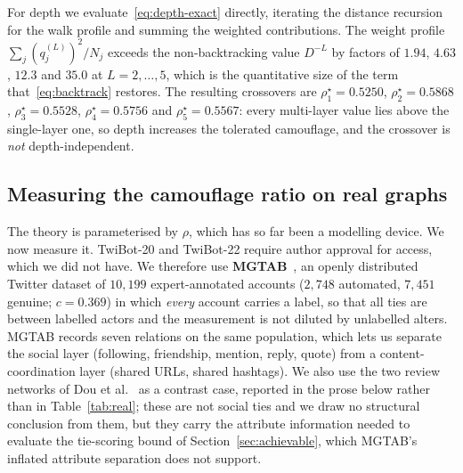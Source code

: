 \documentclass[onecolumn,pdflatex,sn-basic,Numbered]{sn-jnl}
\theoremstyle{thmstyleone}
\theoremstyle{thmstylethree}
\begin{document}
For depth we evaluate~\eqref{eq:depth-exact} directly, iterating the
distance recursion for the walk profile and summing the weighted contributions. The weight profile $\sum_j (q^{(L)}_j)^2/N_j$ exceeds the
non-backtracking value $D^{-L}$ by factors of $1.94$, $4.63$, $12.3$ and $35.0$ at
$L = 2,\dots,5$, which is the quantitative size of the term
that~\eqref{eq:backtrack} restores. The resulting crossovers are
$\rho^\star_1 = 0.5250$, $\rho^\star_2 = 0.5868$, $\rho^\star_3 = 0.5528$,
$\rho^\star_4 = 0.5756$ and $\rho^\star_5 = 0.5567$: every multi-layer value lies
above the single-layer one, so depth increases the tolerated camouflage, and the
crossover is \emph{not} depth-independent.

\subsection{Measuring the camouflage ratio on real graphs}
\label{sec:measuring}

The theory is parameterised by $\rho$, which has so far been a modelling device. We
now measure it. TwiBot-20 and TwiBot-22 require author approval for access, which we
did not have. We therefore use \textbf{MGTAB}~\citep{shi2023mgtab}, an openly
distributed Twitter dataset of $10{,}199$ expert-annotated accounts
($2{,}748$ automated, $7{,}451$ genuine; $c = 0.369$) in which \emph{every} account
carries a label, so that all ties are between labelled actors and the measurement is
not diluted by unlabelled alters. MGTAB records seven relations on the same
population, which lets us separate the social layer (following, friendship, mention,
reply, quote) from a content-coordination layer (shared URLs, shared hashtags). We also use the
two review networks of Dou et al.~\citep{dou2020caregnn} as a contrast case,
reported in the prose below rather than in Table~\ref{tab:real}; these are not social
ties and we draw no structural conclusion from them, but they carry the attribute
information needed to evaluate the tie-scoring bound of
Section~\ref{sec:achievable}, which MGTAB's inflated attribute separation does not
support.
\end{document}
